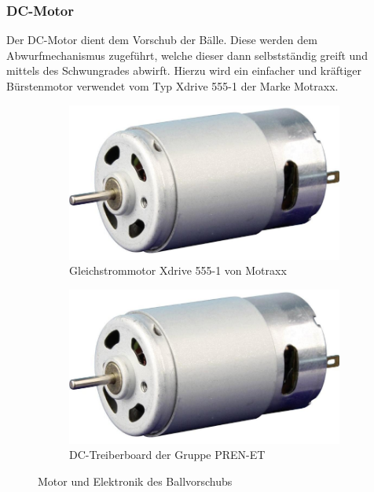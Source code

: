 \subsubsection{DC-Motor}
Der DC-Motor dient dem Vorschub der Bälle. Diese werden dem
Abwurfmechanismus zugeführt, welche dieser dann selbstständig
greift und mittels des Schwungrades abwirft. Hierzu wird ein
einfacher und kräftiger Bürstenmotor verwendet vom Typ Xdrive
555-1 der Marke Motraxx.

\begin{figure}[h!]
	\centering
	\begin{subfigure}[b]{0.45\textwidth}
		\centering
		\includegraphics[width=1\textwidth]{../../fig/et/dc_01.png}
		\caption{Gleichstrommotor Xdrive 555-1 von Motraxx}
	\end{subfigure}
	\begin{subfigure}[b]{0.45\textwidth}
		\centering
		\includegraphics[width=1\textwidth]{../../fig/et/dc_01.png}
		\caption{DC-Treiberboard der Gruppe PREN-ET}
	\end{subfigure}
	\caption{Motor und Elektronik des Ballvorschubs}
\end{figure}

